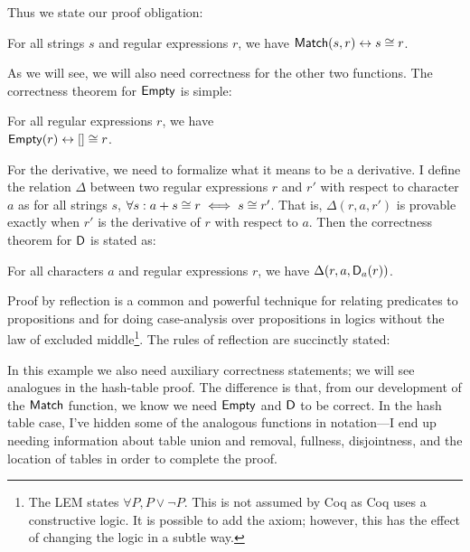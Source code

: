 Thus we state our proof obligation:
\begin{thm}\label{Th:r_match}
    For all strings \(s\) and regular expressions \(r\), we have
    \(\mathsf{Match}(s, r) \mathrel{\leftrightarrow} s \mathrel{\cong} r\).
\end{thm}

As we will see, we will also need correctness for the other two functions. The
correctness theorem for \(\mathsf{Empty}\) is simple:
\begin{lem}\label{Lem:r_empty}
    For all regular expressions \(r\), we have \\
    \(\mathsf{Empty}(r) \mathrel{\leftrightarrow} [] \mathrel{\cong} r\).
\end{lem}

For the derivative, we need to formalize what it means to be a derivative. I
define the relation \(\Delta\) between two regular expressions \(r\) and \(r'\)
with respect to character \(a\) as for all strings \(s\), \(\forall s: a+s
\mathrel{\cong} r \iff s \mathrel{\cong} r'\). That is, \(\Delta(r, a, r')\) is provable
exactly when \(r'\) is the derivative of \(r\) with respect to \(a\). Then the
correctness theorem for \(\mathsf{D}\) is stated as:
\begin{lem}\label{Lem:r_derive}
    For all characters \(a\) and regular expressions \(r\), we have
    \(\Delta(r, a, \mathsf{D}_a(r))\).
\end{lem}

Proof by reflection is a common and powerful technique for relating predicates
to propositions and for doing case-analysis over propositions in logics without
the law of excluded middle\footnote{The LEM states \(\forall P, P \lor \neg P\).
This is not assumed by Coq as Coq uses a constructive logic. It is possible to
add the axiom; however, this has the effect of changing the logic in a subtle
way.}. The rules of reflection are succinctly stated:


In this example we also need auxiliary correctness statements; we will see
analogues in the hash-table proof. The difference is that, from our development
of the \(\mathsf{Match}\) function, we know we need \(\mathsf{Empty}\) and
\(\mathsf{D}\) to be correct. In the hash table case, I've hidden some of the
analogous functions in notation---I end up needing information about table union
and removal, fullness, disjointness, and the location of tables in order to
complete the proof.

